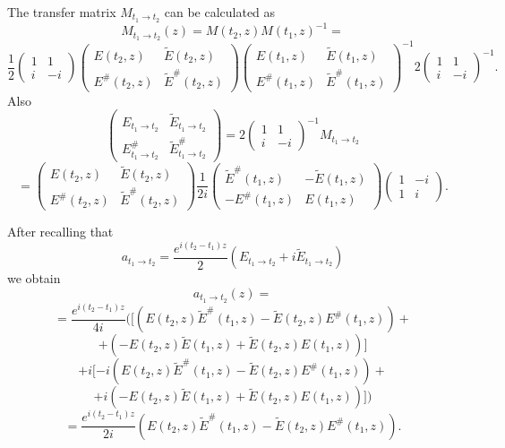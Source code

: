 \documentclass[11pt,twoside,reqno]{amsart}
\def\ti{\tilde}
\def\to{\rightarrow}
\theoremstyle{plain}
\numberwithin{equation}{section}
\begin{document}
The transfer matrix $M_{t_1 \to t_2}$ can be calculated as
$$M_{t_1 \to t_2}(z)=M(t_2,z) M(t_1,z)^{-1}=
$$$$
\frac 12 \begin{pmatrix} 1 & 1 \\ i & -i \end{pmatrix}\begin{pmatrix} E(t_2,z) &  \ti E(t_2,z) \\    E^\#(t_2,z) & \ti E^\#(t_2,z)
\end{pmatrix}\begin{pmatrix} E(t_1,z) & \ti E(t_1,z) \\  E^\#(t_1,z) & \ti E^\#(t_1,z) \end{pmatrix}^{-1} 2 \begin{pmatrix} 1 & 1 \\ i & -i \end{pmatrix}^{-1}.
$$
Also
$$
\begin{pmatrix} E_{t_1 \to t_2} & \ti E_{t_1 \to t_2} \\ E^\#_{t_1 \to t_2} & \ti E^\#_{t_1 \to t_2} \end{pmatrix}=2 \begin{pmatrix} 1 & 1 \\ i & -i \end{pmatrix}^{-1}M_{t_1 \to t_2}
$$
\begin{equation}
=\begin{pmatrix} E(t_2,z) &  \ti E(t_2,z) \\    E^\#(t_2,z) & \ti E^\#(t_2,z)\end{pmatrix}\frac 1{2i} \begin{pmatrix} \ti E^\#(t_1,z) & -\ti E(t_1,z) \\  -E^\#(t_1,z) & E(t_1,z) \end{pmatrix}
\begin{pmatrix} 1 & -i \\ 1 & i \end{pmatrix}.
\label{fin10}\end{equation}

After recalling that
$$a_{t_1 \to t_2}=\frac {e^{i(t_2-t_1)z}}2(E_{t_1 \to t_2}+i \ti E_{t_1 \to t_2})$$
we obtain
$$a_{t_1 \to t_2}(z)=$$$$=\frac {e^{i(t_2-t_1)z}}{4i}([(E(t_2,z)\ti E^\#(t_1,z)-\ti E(t_2,z)E^\#(t_1,z)) +$$$$+ (- E(t_2,z)\ti E(t_1,z) + \ti E(t_2,z)E(t_1,z))]
$$$$
+i[-i (E(t_2,z)\ti E^\#(t_1,z)-\ti E(t_2,z)E^\#(t_1,z)) +$$$$+i (- E(t_2,z)\ti E(t_1,z) + \ti E(t_2,z)E(t_1,z))])
$$$$
=\frac {e^{i(t_2-t_1)z}}{2i}( E(t_2,z)\ti E^\#(t_1,z)-\ti E(t_2,z)E^\#(t_1,z) ) .
$$
\end{document}
